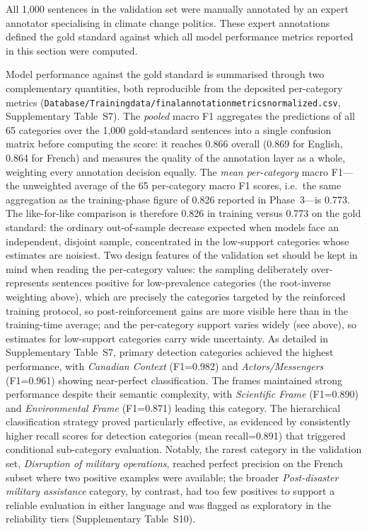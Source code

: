 \documentclass[12pt]{article}
\renewcommand\_{\texttt{\detokenize{_}\allowbreak}}
\begin{document}
All 1,000 sentences in the validation set were manually annotated by an expert annotator specialising in climate change politics. These expert annotations defined the gold standard against which all model performance metrics reported in this section were computed.

Model performance against the gold standard is summarised through two complementary quantities, both reproducible from the deposited per-category metrics (\texttt{Database/Training\_data/final\_annotation\_metrics\_normalized.csv}, Supplementary Table~S7). The \emph{pooled} macro F1 aggregates the predictions of all 65 categories over the 1{,}000 gold-standard sentences into a single confusion matrix before computing the score: it reaches 0.866 overall (0.869 for English, 0.864 for French) and measures the quality of the annotation layer as a whole, weighting every annotation decision equally. The \emph{mean per-category} macro F1---the unweighted average of the 65 per-category macro F1 scores, i.e.\ the same aggregation as the training-phase figure of 0.826 reported in Phase~3---is 0.773. The like-for-like comparison is therefore 0.826 in training versus 0.773 on the gold standard: the ordinary out-of-sample decrease expected when models face an independent, disjoint sample, concentrated in the low-support categories whose estimates are noisiest. Two design features of the validation set should be kept in mind when reading the per-category values: the sampling deliberately over-represents sentences positive for low-prevalence categories (the root-inverse weighting above), which are precisely the categories targeted by the reinforced training protocol, so post-reinforcement gains are more visible here than in the training-time average; and the per-category support varies widely (see above), so estimates for low-support categories carry wide uncertainty. As detailed in Supplementary Table~S7, primary detection categories achieved the highest performance, with \textit{Canadian Context} (F1=0.982) and \textit{Actors/Messengers} (F1=0.961) showing near-perfect classification. The frames maintained strong performance despite their semantic complexity, with \textit{Scientific Frame} (F1=0.890) and \textit{Environmental Frame} (F1=0.871) leading this category. The hierarchical classification strategy proved particularly effective, as evidenced by consistently higher recall scores for detection categories (mean recall=0.891) that triggered conditional sub-category evaluation. Notably, the rarest category in the validation set, \textit{Disruption of military operations}, reached perfect precision on the French subset where two positive examples were available; the broader \textit{Post-disaster military assistance} category, by contrast, had too few positives to support a reliable evaluation in either language and was flagged as exploratory in the reliability tiers (Supplementary Table~S10).
\end{document}
